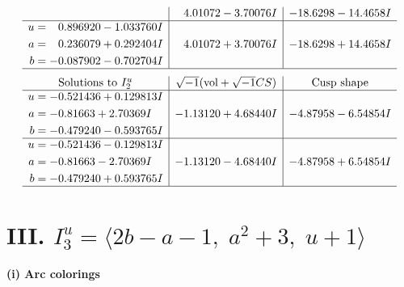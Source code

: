 \documentclass[1p]{elsarticle_modified}
\theoremstyle{definition}
\newcommand{\I}{\sqrt{-1}}
\begin{document}
$$\begin{array}{c|c|c}
 & \phantom{-}4.01072 - 3.70076 I & -18.6298 - 14.4658 I \\ \hline\begin{aligned}
u &= \phantom{-}0.896920 - 1.033760 I \\
a &= \phantom{-}0.236079 + 0.292404 I \\
b &= -0.087902 - 0.702704 I\end{aligned}
 & \phantom{-}4.01072 + 3.70076 I & -18.6298 + 14.4658 I\\
 \hline 
 \end{array}$$\newpage$$\begin{array}{c|c|c}  
\text{Solutions to }I^u_{2}& \I (\text{vol} + \sqrt{-1}CS) & \text{Cusp shape}\\
 \hline 
\begin{aligned}
u &= -0.521436 + 0.129813 I \\
a &= -0.81663 + 2.70369 I \\
b &= -0.479240 - 0.593765 I\end{aligned}
 & -1.13120 + 4.68440 I & -4.87958 - 6.54854 I \\ \hline\begin{aligned}
u &= -0.521436 - 0.129813 I \\
a &= -0.81663 - 2.70369 I \\
b &= -0.479240 + 0.593765 I\end{aligned}
 & -1.13120 - 4.68440 I & -4.87958 + 6.54854 I\\
 \hline 
 \end{array}$$\newpage\newpage\renewcommand{\arraystretch}{1}
\centering \section*{III. $I^u_{3}= \langle 2 b- a-1,\;a^2+3,\;u+1 \rangle$}
\flushleft \textbf{(i) Arc colorings}\\
\end{document}
